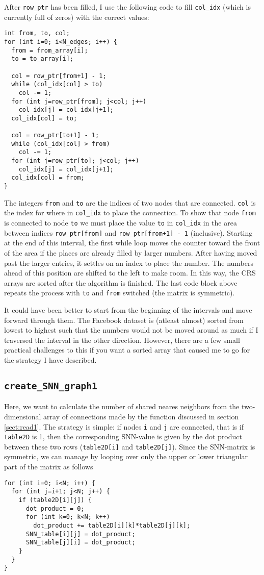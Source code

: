 \documentclass[reprint, english,notitlepage,nofootinbib]{revtex4-1}  %
\begin{document}
After \verb|row_ptr| has been filled, I use the following code to fill \verb|col_idx| (which is currently full of zeros) with the correct values:
\begin{verbatim}
int from, to, col;
for (int i=0; i<N_edges; i++) {
  from = from_array[i];
  to = to_array[i];

  col = row_ptr[from+1] - 1;
  while (col_idx[col] > to)
    col -= 1;
  for (int j=row_ptr[from]; j<col; j++)
    col_idx[j] = col_idx[j+1];
  col_idx[col] = to;

  col = row_ptr[to+1] - 1;
  while (col_idx[col] > from)
    col -= 1;
  for (int j=row_ptr[to]; j<col; j++)
    col_idx[j] = col_idx[j+1];
  col_idx[col] = from;
}
\end{verbatim}
The integers \verb|from| and \verb|to| are the indices of two nodes that are connected. \verb|col| is the index for where in \verb|col_idx| to place the connection. To show that node \verb|from| is connected to node \verb|to| we must place the value \verb|to| in \verb|col_idx| in the area between indices \verb|row_ptr[from]| and \verb|row_ptr[from+1] - 1| (inclusive). Starting at the end of this interval, the first while loop moves the counter toward the front of the area if the places are already filled by larger numbers. After having moved past the larger entries, it settles on an index to place the number. The numbers ahead of this position are shifted to the left to make room. In this way, the CRS arrays are sorted after the algorithm is finished. The last code block above repeats the process with \verb|to| and \verb|from| switched (the matrix is symmetric).

It could have been better to start from the beginning of the intervals and move forward through them. The Facebook dataset is (atleast almost) sorted from lowest to highest such that the numbers would not be moved around as much if I traversed the interval in the other direction. However, there are a few small practical challenges to this if you want a sorted array that caused me to go for the strategy I have described.


\subsection{\texttt{create\_SNN\_graph1}}

Here, we want to calculate the number of shared neares neighbors from the two-dimensional array of connections made by the function discussed in section \ref{sect:read1}. The strategy is simple: if nodes \verb|i| and \verb|j| are connected, that is if \verb|table2D| is 1, then the corresponding SNN-value is given by the dot product between these two rows (\verb|table2D[i]| and \verb|table2D[j]|). Since the SNN-matrix is symmetric, we can manage by looping over only the upper or lower triangular part of the matrix as follows
\begin{verbatim}
for (int i=0; i<N; i++) {
  for (int j=i+1; j<N; j++) {
    if (table2D[i][j]) {
      dot_product = 0;
      for (int k=0; k<N; k++)
        dot_product += table2D[i][k]*table2D[j][k];
      SNN_table[i][j] = dot_product;
      SNN_table[j][i] = dot_product;
    }
  }
}
\end{verbatim}
\end{document}
